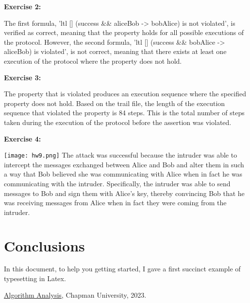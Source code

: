 \documentclass{article}
\theoremstyle{theorem}
\theoremstyle{definition}
\theoremstyle{remark}
\begin{document}
{\bf Exercise 2:}

The first formula, 'ltl {[] (success \&\& aliceBob -> bobAlice)} is not violated', is verified as correct, meaning that the property holds for all possible executions of the protocol. However, the second formula, 'ltl {[] (success \&\& bobAlice -> aliceBob)} is violated', is not correct, meaning that there exists at least one execution of the protocol where the property does not hold.


{\bf Exercise 3:}

The property that is violated produces an execution sequence where the specified property does not hold. Based on the trail file, the length of the execution sequence that violated the property is 84 steps. This is the total number of steps taken during the execution of the protocol before the assertion was violated.

{\bf Exercise 4:}

\texttt{[image: hw9.png]}
The attack was successful because the intruder was able to intercept the messages exchanged between Alice and Bob and alter them in such a way that Bob believed she was communicating with Alice when in fact he was communicating with the intruder. Specifically, the intruder was able to send messages to Bob and sign them with Alice's key, thereby convincing Bob that he was receiving messages from Alice when in fact they were coming from the intruder.

\section{Conclusions}\label{conclusions}

In this document, to help you getting started, I gave a first succinct example of typesetting in Latex.

\begin{thebibliography}{99}
 \href{https://github.com/alexhkurz/algorithm-analysis-2023}{Algorithm Analysis}, Chapman University, 2023.
\end{thebibliography}
\end{document}

